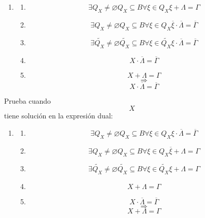 \begin{enumerate}
\begin{enumerate}
\begin{enumerate}
\begin{enumerate}
\begin{enumerate}
          \begin{enumerate}
          \def\labelenumvi{\arabic{enumvi}.}
          \tightlist
          \item
            \begin{enumerate}
            \def\labelenumvii{\arabic{enumvii}.}
            \tightlist
            \item
              \[\exists{Q_{X} \neq \varnothing}{Q_{X} \subseteq B}\forall{\xi \in Q_{X}}{{\xi + \Lambda} = \Gamma}\]
            \item
              \[\exists{Q_{X} \neq \varnothing}{Q_{X} \subseteq B}\forall{\xi \in Q_{X}}{{\overline{\xi} \cdot \overline{\Lambda}} = \overline{\Gamma}}\]
            \item
              \[\exists{\widetilde{Q_{X}} \neq \varnothing}{\widetilde{Q_{X}} \subseteq B}\forall{\xi \in \widetilde{Q_{X}}}{{\xi \cdot \overline{\Lambda}} = \overline{\Gamma}}\]
            \item
              \[{X \cdot \overline{\Lambda}} = \overline{\Gamma}\]
            \item
              \[{X + \Lambda} = \Gamma\] \[\Rightarrow\]
              \[{X \cdot \overline{\Lambda}} = \overline{\Gamma}\]
            \end{enumerate}
          \end{enumerate}

          Prueba cuando \[X\] tiene solución en la expresión dual:

          \begin{enumerate}
          \def\labelenumvi{\arabic{enumvi}.}
          \tightlist
          \item
            \begin{enumerate}
            \def\labelenumvii{\arabic{enumvii}.}
            \tightlist
            \item
              \[\exists{Q_{X} \neq \varnothing}{Q_{X} \subseteq B}\forall{\xi \in Q_{X}}{{\xi \cdot \overline{\Lambda}} = \overline{\Gamma}}\]
            \item
              \[\exists{Q_{X} \neq \varnothing}{Q_{X} \subseteq B}\forall{\xi \in Q_{X}}{{\overline{\xi} + \Lambda} = \Gamma}\]
            \item
              \[\exists{\widetilde{Q_{X}} \neq \varnothing}{\widetilde{Q_{X}} \subseteq B}\forall{\xi \in \widetilde{Q_{X}}}{{\xi + \Lambda} = \Gamma}\]
            \item
              \[{X + \Lambda} = \Gamma\]
            \item
              \[{X \cdot \overline{\Lambda}} = \overline{\Gamma}\]
              \[\Rightarrow\] \[{X + \Lambda} = \Gamma\]
            \end{enumerate}
          \end{enumerate}


\end{enumerate}
\end{enumerate}
\end{enumerate}
\end{enumerate}
\end{enumerate}
